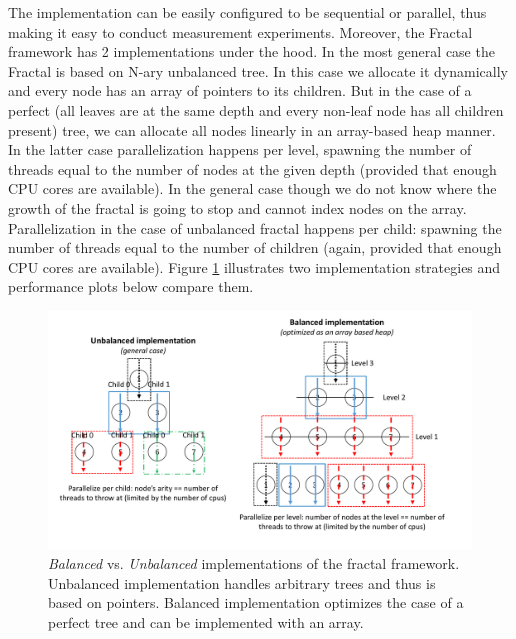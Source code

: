 \quad The implementation can be easily configured to be sequential or parallel, thus making it easy to conduct measurement experiments. Moreover, the Fractal framework has 2 implementations under the hood. In the most general case the Fractal is based on N-ary unbalanced tree. In this case we allocate it dynamically and every node has an array of pointers to its children. But in the case of a perfect (all leaves are at the same depth and every non-leaf node has all children present) tree, we can allocate all nodes linearly in an array-based heap manner. In the latter case parallelization happens per level, spawning the number of threads equal to the number of nodes at the given depth (provided that enough CPU cores are available). In the general case though we do not know where the growth of the fractal is going to stop and cannot index nodes on the array. Parallelization in the case of unbalanced fractal happens per child: spawning the number of threads equal to the number of children (again, provided that enough CPU cores are available). Figure \ref{fig:balanced_vs_unbalanced} illustrates two implementation strategies and performance plots below compare them.
\begin{figure}[!htb]
\includegraphics[width=1.0\textwidth]{images/balanced_vs_unbalanced.pdf}
\caption{\textit{Balanced} vs. \textit{Unbalanced} implementations of the fractal framework. Unbalanced implementation handles arbitrary trees and thus is based on pointers. Balanced implementation optimizes the case of a perfect tree and can be implemented with an array.}
\label{fig:balanced_vs_unbalanced}
\end{figure}\newline\null
